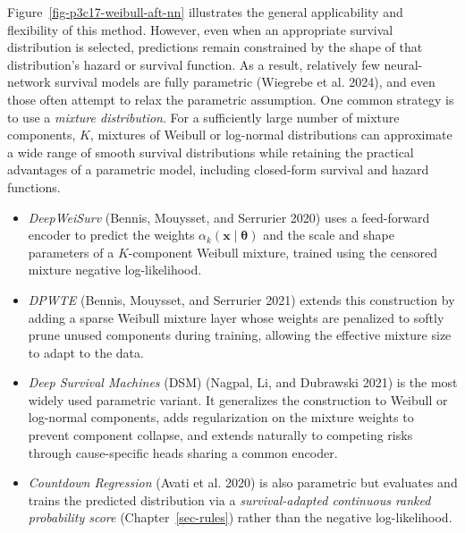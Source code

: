 \documentclass[
  letterpaper,
  krantz2]{style/krantz}
\providecommand{\tightlist}{%
  \setlength{\itemsep}{0pt}\setlength{\parskip}{0pt}}
\begin{document}
Figure~\ref{fig-p3c17-weibull-aft-nn} illustrates the general
applicability and flexibility of this method. However, even when an
appropriate survival distribution is selected, predictions remain
constrained by the shape of that distribution's hazard or survival
function. As a result, relatively few neural-network survival models are
fully parametric (Wiegrebe et al. 2024), and even those often attempt to
relax the parametric assumption. One common strategy is to use a
\emph{mixture distribution}. For a sufficiently large number of mixture
components, \(K\), mixtures of Weibull or log-normal distributions can
approximate a wide range of smooth survival distributions while
retaining the practical advantages of a parametric model, including
closed-form survival and hazard functions.

\begin{itemize}
\tightlist
\item
  \emph{DeepWeiSurv} (Bennis, Mouysset, and Serrurier 2020) uses a
  feed-forward encoder to predict the weights
  \(\alpha_k(\mathbf{x}\mid \boldsymbol{\theta})\) and the scale and
  shape parameters of a \(K\)-component Weibull mixture, trained using
  the censored mixture negative
  log-likelihood.
\item
  \emph{DPWTE} (Bennis, Mouysset, and Serrurier 2021) extends this
  construction by adding a sparse Weibull mixture layer whose weights
  are penalized to softly prune unused components during training,
  allowing the effective mixture size to adapt to the
  data.
\item
  \emph{Deep Survival Machines} (DSM) (Nagpal, Li, and Dubrawski 2021)
  is the most widely used parametric variant. It generalizes the
  construction to Weibull or log-normal components, adds regularization
  on the mixture weights to prevent component collapse, and extends
  naturally to competing risks through cause-specific heads sharing a
  common
  encoder.
\item
  \emph{Countdown Regression} (Avati et al. 2020) is also parametric but
  evaluates and trains the predicted distribution via a
  \emph{survival-adapted continuous ranked probability score}
  (Chapter~\ref{sec-rules}) rather than the negative
  log-likelihood.
\end{itemize}
\end{document}
